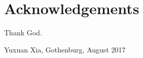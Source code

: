 \thispagestyle{plain}			%
\section*{Acknowledgements}
Thank God.

\vspace{1.5cm}
\hfill
Yuxuan Xia, Gothenburg, August 2017

\newpage				%
\thispagestyle{empty}
\mbox{}